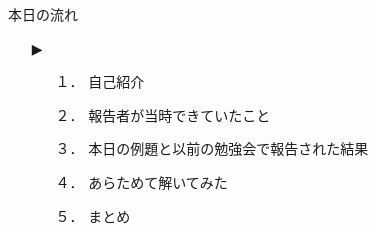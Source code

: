 \begin{frame}{本日の流れ}
  \begin{itemize}
     \item[▶] 
     \begin{itemize}[itemsep=1.3ex, leftmargin=1cm]
       \item[１．] 自己紹介
       \item[２．] 報告者が当時できていたこと
       \item[３．] 本日の例題と以前の勉強会で報告された結果
       \item[４．] あらためて解いてみた
       \item[５．] まとめ
    \end{itemize}
  \end{itemize}
\end{frame}

